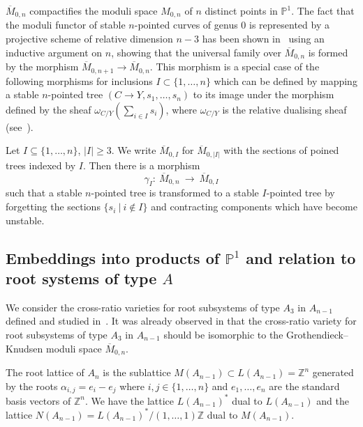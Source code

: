 \documentclass[ALCO,ThmDefs,Unicode,epreuves]{cedram}
\def\Z{\mathds Z}
\def\P{\mathds P}
\begin{document}
$\overline{M}_{0,n}$ compactifies the moduli space $M_{0,n}$ of $n$ distinct 
points in $\P^1$.
The fact that the moduli functor of stable $n$-pointed curves of genus $0$
is represented by a projective scheme of relative dimension $n-3$ has been shown
in~\cite{Kn83} using an inductive argument on $n$, showing that the 
universal family over $\overline{M}_{0,n}$ is formed by the morphism
$\overline{M}_{0,n+1}\to\overline{M}_{0,n}$.
This morphism is a special case of the following morphisms for inclusions 
$I\subset\{1,\ldots,n\}$ which can be defined by mapping a stable $n$-pointed 
tree $(C\to Y,s_1,\ldots,s_n)$ to its image under the morphism defined by the
sheaf $\omega_{C/Y}(\sum_{i\in I}s_i)$, where $\omega_{C/Y}$ is the relative
dualising sheaf (see~\cite{Kn83}).

\begin{prop} 
Let $I\subseteq\{1,\ldots,n\}$, $|I|\geq 3$. We write $\overline{M}_{0,I}$ 
for $\overline{M}_{0,|I|}$ with the sections of poined trees indexed by $I$. 
Then there is a morphism
\[
\gamma_I\colon\:\overline{M}_{0,n}\:\to\:\overline{M}_{0,I}
\]
such that a stable $n$-pointed tree is transformed to a stable $I$-pointed
tree by forgetting the sections $\{s_i\:|\:i\not\in I\}$ and contracting
components which have become unstable.
\end{prop}


\subsection{Embeddings into products of \texorpdfstring{$\P^1\!$}{P1} and relation to root systems of type \texorpdfstring{$A$}{A}}

We consider the cross-ratio varieties for root subsystems of type $A_3$ in $A_{n-1}$ 
defined and studied in~\cite{Sek94, Sek96}. It was already observed in 
\cite{Sek96} that the cross-ratio variety for root subsystems of type $A_3$ in $A_{n-1}$ 
should be isomorphic to the Grothendieck--Knudsen moduli space $\overline{M}_{0,n}$. 


The root lattice of $A_n$ is the sublattice $M(A_{n-1})\subset L(A_{n-1})=\Z^n$ 
generated by the roots $\alpha_{i,j}=e_i-e_j$ where $i,j\in\{1,\ldots,n\}$ 
and $e_1,\ldots,e_n$ are the standard basis vectors of $\Z^n$. We have the 
lattice $L(A_{n-1})^*$ dual to $L(A_{n-1})$ and the lattice 
$N(A_{n-1})=L(A_{n-1})^*/(1,\ldots,1)\Z$ dual to $M(A_{n-1})$.

\end{document}
